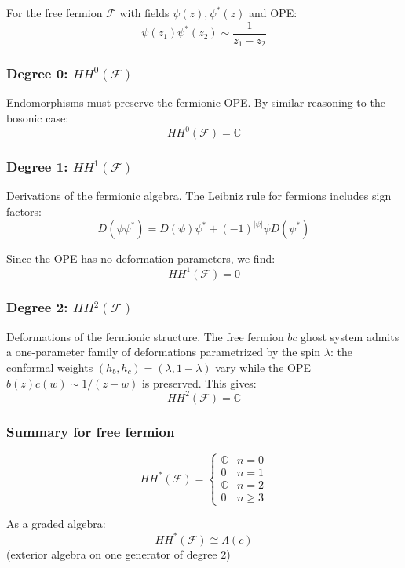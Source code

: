 \begin{example}\label{ex:HH-fermion-complete}
For the free fermion $\mathcal{F}$ with fields $\psi(z), \psi^*(z)$ and OPE:
\[\psi(z_1)\psi^*(z_2) \sim \frac{1}{z_1 - z_2}\]

\subsubsection{\texorpdfstring{Degree 0: $HH^0(\mathcal{F})$}{Degree 0: HH 0(F)}}

Endomorphisms must preserve the fermionic OPE. By similar reasoning to the bosonic case:
\[HH^0(\mathcal{F}) = \mathbb{C}\]

\subsubsection{\texorpdfstring{Degree 1: $HH^1(\mathcal{F})$}{Degree 1: HH 1(F)}}

Derivations of the fermionic algebra. The Leibniz rule for fermions includes sign factors:
\[D(\psi \psi^*) = D(\psi)\psi^* + (-1)^{|\psi|} \psi D(\psi^*)\]

Since the OPE has no deformation parameters, we find:
\[HH^1(\mathcal{F}) = 0\]

\subsubsection{\texorpdfstring{Degree 2: $HH^2(\mathcal{F})$}{Degree 2: HH 2(F)}}

Deformations of the fermionic structure.  The free fermion $bc$ ghost system admits a one-parameter family of deformations parametrized by the spin $\lambda$:  the conformal weights $(h_b, h_c) = (\lambda, 1-\lambda)$ vary while the OPE $b(z)c(w) \sim 1/(z-w)$ is preserved.  This gives:
\[HH^2(\mathcal{F}) = \mathbb{C}\]

\subsubsection{Summary for free fermion}

\[HH^*(\mathcal{F}) = \begin{cases}
\mathbb{C} & n = 0\\
0 & n = 1\\
\mathbb{C} & n = 2\\
0 & n \geq 3
\end{cases}\]

As a graded algebra:
\[HH^*(\mathcal{F}) \cong \Lambda(c)\]
(exterior algebra on one generator of degree 2)
\end{example}


